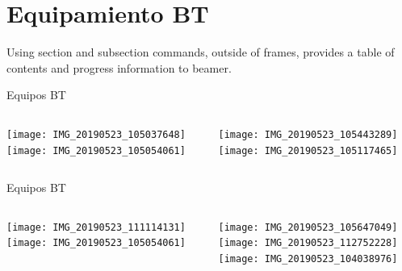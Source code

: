 \documentclass[ignorenonframetext,12pt]{beamer}
\begin{document}
\section{Equipamiento BT}
Using section and subsection commands, outside of frames, provides a table of contents and progress information to beamer.
\begin{frame}{Equipos BT}
				\begin{columns}
								\begin{column}{0.45\textwidth}
												\texttt{[image: IMG\_20190523\_105037648]} \\ 
												\texttt{[image: IMG\_20190523\_105054061]}
								\end{column}
								\begin{column}{0.45\textwidth}
												\texttt{[image: IMG\_20190523\_105443289]} \\ 
												\texttt{[image: IMG\_20190523\_105117465]}
								\end{column}
				\end{columns}


\end{frame}

\begin{frame}{Equipos BT}
				\begin{columns}
								\begin{column}{0.45\textwidth}
												\texttt{[image: IMG\_20190523\_111114131]} \\ 
												\texttt{[image: IMG\_20190523\_105054061]}
								\end{column}
								\begin{column}{0.45\textwidth}
												\texttt{[image: IMG\_20190523\_105647049]} \\ 
												\hspace{2mm}\texttt{[image: IMG\_20190523\_112752228]} \\
												\texttt{[image: IMG\_20190523\_104038976]}
								\end{column}
				\end{columns}
\end{frame}
\end{document}
